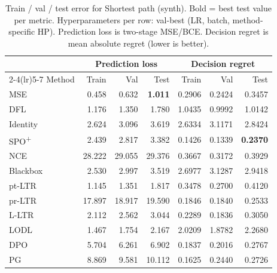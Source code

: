 \begin{table}[h]
\centering
\caption[Train/val/test error for Shortest path (synth).]{Train / val / test error for Shortest path (synth). Bold = best test value per metric. Hyperparameters per row: val-best (LR, batch, method-specific HP). Prediction loss is two-stage MSE/BCE. Decision regret is mean absolute regret (lower is better).}
\label{tab:err-sp-synth}
\setlength{\tabcolsep}{4pt}
\renewcommand{\arraystretch}{1.05}
\begin{tabular}{@{}lrrrrrr@{}}
\toprule
& \multicolumn{3}{c}{Prediction loss} & \multicolumn{3}{c}{Decision regret} \\
\cmidrule(lr){2-4}\cmidrule(lr){5-7}
Method & Train & Val & Test & Train & Val & Test \\
\midrule
MSE & 0.458 & 0.632 & \textbf{1.011} & 0.2906 & 0.2424 & 0.3457 \\
DFL & 1.176 & 1.350 & 1.780 & 1.0435 & 0.9992 & 1.0142 \\
Identity & 2.624 & 3.096 & 3.619 & 2.6334 & 3.1171 & 2.8424 \\
SPO\textsuperscript{+} & 2.439 & 2.817 & 3.382 & 0.1426 & 0.1339 & \textbf{0.2370} \\
NCE & 28.222 & 29.055 & 29.376 & 0.3667 & 0.3172 & 0.3929 \\
Blackbox & 2.530 & 2.997 & 3.519 & 2.6977 & 3.1287 & 2.9418 \\
pt-LTR & 1.145 & 1.351 & 1.817 & 0.3478 & 0.2700 & 0.4120 \\
pr-LTR & 17.897 & 18.917 & 19.590 & 0.1846 & 0.1840 & 0.2533 \\
L-LTR & 2.112 & 2.562 & 3.044 & 0.2289 & 0.1836 & 0.3050 \\
LODL & 1.467 & 1.754 & 2.167 & 2.0209 & 1.8782 & 2.2680 \\
DPO & 5.704 & 6.261 & 6.902 & 0.1837 & 0.2016 & 0.2767 \\
PG & 8.869 & 9.581 & 10.112 & 0.1625 & 0.2440 & 0.2726 \\
\bottomrule
\end{tabular}
\end{table}

